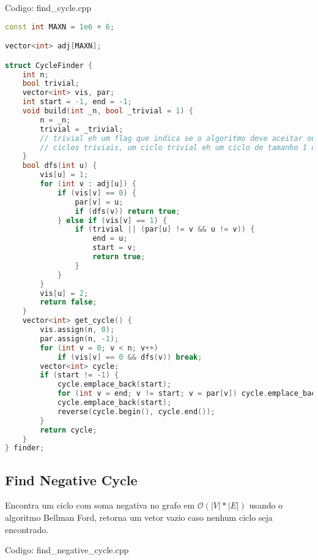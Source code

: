 \documentclass[10pt, a4paper, oneside]{book}
\begin{document}
Codigo: find\_cycle.cpp

\begin{lstlisting}[language=C++]
const int MAXN = 1e6 + 6;

vector<int> adj[MAXN];

struct CycleFinder {
    int n;
    bool trivial;
    vector<int> vis, par;
    int start = -1, end = -1;
    void build(int _n, bool _trivial = 1) {
        n = _n;
        trivial = _trivial;
        // trivial eh um flag que indica se o algoritmo deve aceitar ou nao
        // ciclos triviais, um ciclo trivial eh um ciclo de tamanho 1 ou 2
    }
    bool dfs(int u) {
        vis[u] = 1;
        for (int v : adj[u]) {
            if (vis[v] == 0) {
                par[v] = u;
                if (dfs(v)) return true;
            } else if (vis[v] == 1) {
                if (trivial || (par[u] != v && u != v)) {
                    end = u;
                    start = v;
                    return true;
                }
            }
        }
        vis[u] = 2;
        return false;
    }
    vector<int> get_cycle() {
        vis.assign(n, 0);
        par.assign(n, -1);
        for (int v = 0; v < n; v++)
            if (vis[v] == 0 && dfs(v)) break;
        vector<int> cycle;
        if (start != -1) {
            cycle.emplace_back(start);
            for (int v = end; v != start; v = par[v]) cycle.emplace_back(v);
            cycle.emplace_back(start);
            reverse(cycle.begin(), cycle.end());
        }
        return cycle;
    }
} finder;
\end{lstlisting}
\hfill

\subsection{Find Negative Cycle}


Encontra um ciclo com soma negativa no grafo em $\mathcal{O}(|V| * |E|)$ usando o algoritmo Bellman Ford, retorna um vetor vazio caso nenhum ciclo seja encontrado.

\hfill

Codigo: find\_negative\_cycle.cpp
\end{document}
